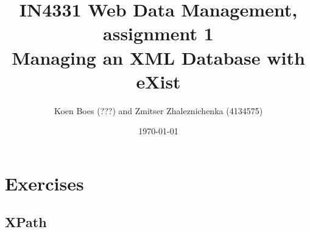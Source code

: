 \documentclass[a4paper, notitlepage]{article}
\begin{document}
\title{IN4331 Web Data Management, assignment 1 \\
Managing an XML Database with eXist}
\author{Koen Boes (???) and Zmitser Zhaleznichenka (4134575)}
\date{\today}
\maketitle

\setcounter{secnumdepth}{0}

\section{Exercises}

\subsection{XPath}
\end{document}
